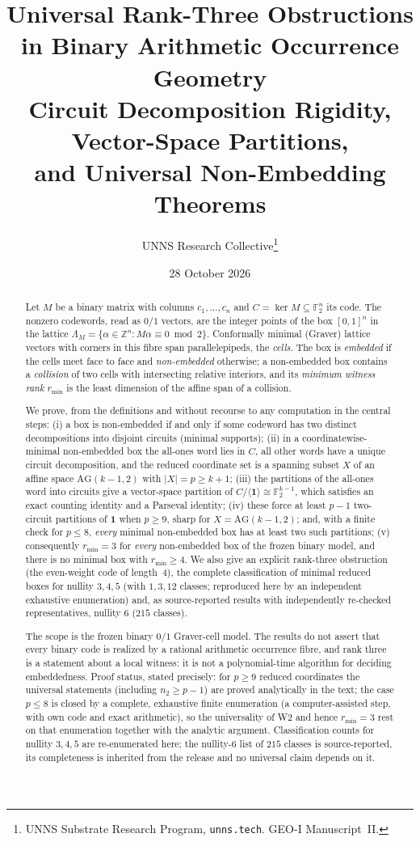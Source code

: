 \documentclass[11pt]{article}
\title{Universal Rank-Three Obstructions in Binary Arithmetic Occurrence Geometry\\[2pt]
\large Circuit Decomposition Rigidity, Vector-Space Partitions,\\ and Universal Non-Embedding Theorems}
\author{UNNS Research Collective\thanks{UNNS Substrate Research Program, \texttt{unns.tech}. GEO-I Manuscript~II.}}
\date{28 October 2026}
\theoremstyle{definition}
\theoremstyle{remark}
\newcommand{\F}{\mathbb F}
\newcommand{\Z}{\mathbb Z}
\newcommand{\one}{\mathbf 1}
\newcommand{\AG}{\mathrm{AG}}
\newcommand{\rmin}{r_{\min}}
\begin{document}
\maketitle

\begin{abstract}
\noindent Let $M$ be a binary matrix with columns $c_1,\dots,c_n$ and $C=\ker M\subseteq\F_2^n$ its code. The nonzero codewords, read as $0/1$ vectors, are the integer points of the box $[0,1]^n$ in the lattice $\Lambda_M=\{\alpha\in\Z^n: M\alpha\equiv 0 \bmod 2\}$. Conformally minimal (Graver) lattice vectors with corners in this fibre span parallelepipeds, the \emph{cells}. The box is \emph{embedded} if the cells meet face to face and \emph{non-embedded} otherwise; a non-embedded box contains a \emph{collision} of two cells with intersecting relative interiors, and its \emph{minimum witness rank} $\rmin$ is the least dimension of the affine span of a collision.

We prove, from the definitions and without recourse to any computation in the central steps: (i) a box is non-embedded if and only if some codeword has two distinct decompositions into disjoint circuits (minimal supports); (ii) in a coordinatewise-minimal non-embedded box the all-ones word lies in $C$, all other words have a unique circuit decomposition, and the reduced coordinate set is a spanning subset $X$ of an affine space $\AG(k-1,2)$ with $|X|=p\ge k+1$; (iii) the partitions of the all-ones word into circuits give a vector-space partition of $C/\langle\one\rangle\cong\F_2^{k-1}$, which satisfies an exact counting identity and a Parseval identity; (iv) these force at least $p-1$ two-circuit partitions of $\one$ when $p\ge 9$, sharp for $X=\AG(k-1,2)$; and, with a finite check for $p\le 8$, \emph{every} minimal non-embedded box has at least two such partitions; (v) consequently $\rmin=3$ for \emph{every} non-embedded box of the frozen binary model, and there is no minimal box with $\rmin\ge4$. We also give an explicit rank-three obstruction (the even-weight code of length~4), the complete classification of minimal reduced boxes for nullity $3,4,5$ (with $1,3,12$ classes; reproduced here by an independent exhaustive enumeration) and, as source-reported results with independently re-checked representatives, nullity $6$ ($215$ classes).

The scope is the frozen binary $0/1$ Graver-cell model. The results do not assert that every binary code is realized by a rational arithmetic occurrence fibre, and rank three is a statement about a local witness: it is not a polynomial-time algorithm for deciding embeddedness. Proof status, stated precisely: for $p\ge9$ reduced coordinates the universal statements (including $n_2\ge p-1$) are proved analytically in the text; the case $p\le8$ is closed by a complete, exhaustive finite enumeration (a computer-assisted step, with own code and exact arithmetic), so the universality of W2 and hence $\rmin=3$ rest on that enumeration together with the analytic argument. Classification counts for nullity $3,4,5$ are re-enumerated here; the nullity-$6$ list of $215$ classes is source-reported, its completeness is inherited from the release and no universal claim depends on it.
\end{abstract}
\end{document}
